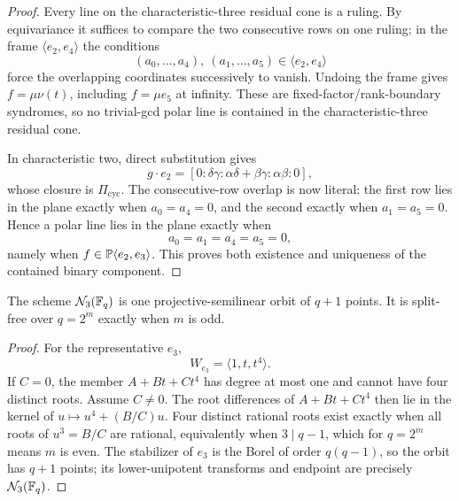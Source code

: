 \begin{proof}
Every line on the characteristic-three residual cone is a ruling.  By
equivariance it suffices
to compare the two consecutive rows on one ruling; in the frame
$\langle e_2,e_4\rangle$ the conditions
\[
(a_0,\ldots,a_4),\ (a_1,\ldots,a_5)\in\langle e_2,e_4\rangle
\]
force the overlapping coordinates successively to vanish.  Undoing
the frame gives $f=\mu\nu(t)$, including $f=\mu e_5$ at infinity.
These are fixed-factor/rank-boundary syndromes, so no trivial-gcd
polar line is contained in the characteristic-three residual cone.

In characteristic two, direct substitution gives
\[
g\cdot e_2=
[0:\delta\gamma:\alpha\delta+\beta\gamma:\alpha\beta:0],
\]
whose closure is $\Pi_{\mathrm{cyc}}$.  The consecutive-row overlap
is now literal: the first row lies in the plane exactly when
$a_0=a_4=0$, and the second exactly when $a_1=a_5=0$.  Hence a polar
line lies in the plane exactly when
\[
a_0=a_1=a_4=a_5=0,
\]
namely when $f\in\mathbb P\langle e_2,e_3\rangle$.  This proves both
existence and uniqueness of the contained binary component.
\end{proof}

\begin{proposition}\label{prop:r6-nucleus}%
%
The scheme $\mathcal N_3(\mathbb F_q)$ is one projective-semilinear orbit of $q+1$
points.  It is split-free over $q=2^m$ exactly when $m$ is odd.
\end{proposition}

\begin{proof}
For the representative $e_3$,
\[
       W_{e_3}=\langle1,t,t^4\rangle.
\]
If \(C=0\), the member \(A+Bt+Ct^4\) has degree at most one and
cannot have four distinct roots.  Assume \(C\ne0\).  The root
differences of $A+Bt+Ct^4$ then lie in the kernel of
$u\mapsto u^4+(B/C)u$.  Four distinct rational roots exist exactly
when all roots of $u^3=B/C$ are rational, equivalently when
$3\mid q-1$, which for $q=2^m$ means $m$ is even.  The stabilizer of
$e_3$ is the Borel of order $q(q-1)$, so the orbit has $q+1$ points;
its lower-unipotent transforms and endpoint are precisely
$\mathcal N_3(\mathbb F_q)$.
\end{proof}

